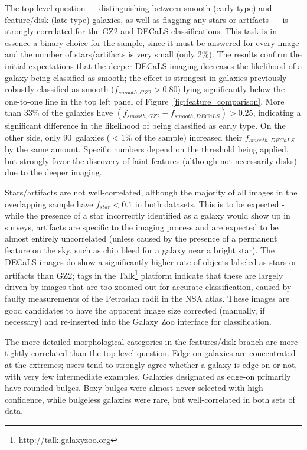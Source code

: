 \documentclass[iop,apj,tighten]{emulateapj}
\begin{document}
The top level question --- distinguishing between smooth (early-type) and feature/disk (late-type) galaxies, as well as flagging any stars or artifacts --- is strongly correlated for the GZ2 and DECaLS classifications. This task is in essence a binary choice for the sample, since it must be answered for every image and the number of stars/artifacts is very small (only 2\%). The results confirm the initial expectations that the deeper DECaLS imaging decreases the likelihood of a galaxy being classified as smooth; the effect is strongest in galaxies previously robustly classified as smooth ($f_{smooth,GZ2}>0.80$) lying significantly below the one-to-one line in the top left panel of Figure~\ref{fig:feature_comparison}. More than 33\% of the galaxies have $(f_{smooth,GZ2} - f_{smooth,DECaLS}) > 0.25$, indicating a significant difference in the likelihood of being classified as early type. On the other side, only 90~galaxies ($<1\%$ of the sample) increased their $f_{smooth,DECaLS}$ by the same amount. Specific numbers depend on the threshold being applied, but strongly favor the discovery of faint features (although not necessarily disks) due to the deeper imaging.

Stars/artifacts are not well-correlated, although the majority of all images in the overlapping sample have $f_{star}<0.1$ in both datasets. This is to be expected - while the presence of a star incorrectly identified as a galaxy would show up in surveys, artifacts are specific to the imaging process and are expected to be almost entirely uncorrelated (unless caused by the presence of a permanent feature on the sky, such as chip bleed for a galaxy near a bright star). The DECaLS images do show a significantly higher rate of objects labeled as stars or artifacts than GZ2; tags in the Talk\footnote{\url{http://talk.galaxyzoo.org}} platform indicate that these are largely driven by images that are too zoomed-out for accurate classification, caused by faulty measurements of the Petrosian radii in the NSA atlas. These images are good candidates to have the apparent image size corrected (manually, if necessary) and re-inserted into the Galaxy Zoo interface for classification. 

The more detailed morphological categories in the features/disk branch are more tightly correlated than the top-level question. Edge-on galaxies are concentrated at the extremes; users tend to strongly agree whether a galaxy is edge-on or not, with very few intermediate examples. Galaxies designated as edge-on primarily have rounded bulges. Boxy bulges were almost never selected with high confidence, while bulgeless galaxies were rare, but well-correlated in both sets of data. 
\end{document}
